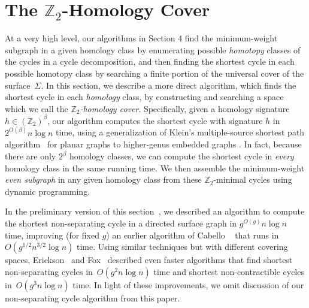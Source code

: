 \documentclass[letterpaper,review]{siamart190516}
\def\Z{\mathbb{Z}}
\begin{document}
\section{The $\Z_2$-Homology Cover}
\label{sec:homcover}

At a very high level, our algorithms in Section 4 find the minimum-weight subgraph in a given homology class by enumerating possible \emph{homotopy} classes of the cycles in a cycle decomposition, and then finding the shortest cycle in each possible homotopy class by searching a finite portion of the universal cover of the surface~$\Sigma$.  In this section, we describe a more direct algorithm, which finds the shortest cycle in each \emph{homology} class, by constructing and searching a space which we call the \emph{$\Z_2$-homology cover}.
Specifically, given a homology signature $h\in (\Z_2)^\beta$, our algorithm computes the shortest
cycle with signature $h$ in $2^{O(\beta)} n \log n$ time, using a generalization of Klein's
multiple-source shortest path algorithm~\cite{k-msspp-05} for planar graphs to higher-genus embedded
graphs \cite{cce-msspe-13,efl-hmcpf-18}.
In fact, because there are only $2^\beta$ homology classes, we can compute the shortest cycle in \emph{every} homology class in the same running time.
We then assemble the minimum-weight \emph{even subgraph} in any given homology class from these $\Z_2$-minimal cycles using dynamic programming.

In the preliminary version of this section~\cite{en-mcsnc-11}, we described an algorithm to compute
the shortest non-separating cycle in a directed surface graph in $g^{O(g)} n \log n$ time, improving
(for fixed $g$) an earlier algorithm of Cabello \etal~\cite{ccl-fsncd-10} that runs in
$O(g^{1/2}n^{3/2}\log n)$ time.  Using similar techniques but with different covering spaces,
Erickson~\cite{e-sncds-11} and Fox~\cite{f-sntcd-13} described even faster algorithms that find
shortest non-separating cycles in~$O(g^2 n \log n)$ time and shortest non-contractible cycles
in~$O(g^3 n \log n)$ time.  In light of these improvements, we omit discussion of our non-separating
cycle algorithm from this paper.
\end{document}
